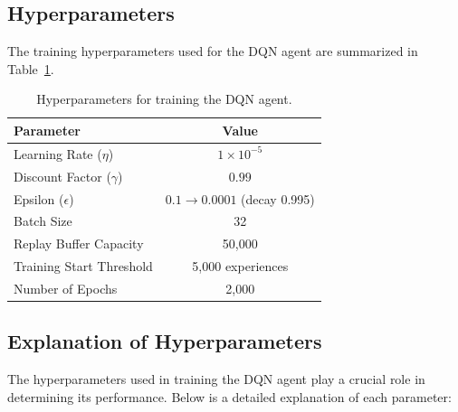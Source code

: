 \documentclass[a4paper,12pt]{article}
\begin{document}
\subsection{Hyperparameters}
The training hyperparameters used for the DQN agent are summarized in Table~\ref{tab:hyperparameters}.
\begin{table}[!ht]
\centering
\begin{tabular}{|l|c|}
\hline
\textbf{Parameter}           & \textbf{Value}          \\ \hline
Learning Rate (\(\eta\))     & \(1 \times 10^{-5}\)     \\ \hline
Discount Factor (\(\gamma\)) & \(0.99\)                \\ \hline
Epsilon (\(\epsilon\))       & \(0.1 \rightarrow 0.0001\) (decay 0.995) \\ \hline
Batch Size                   & 32                      \\ \hline
Replay Buffer Capacity       & 50,000                  \\ \hline
Training Start Threshold     & 5,000 experiences       \\ \hline
Number of Epochs             & 2,000                   \\ \hline
\end{tabular}
\caption{Hyperparameters for training the DQN agent.}
\label{tab:hyperparameters}
\end{table}

\subsection{Explanation of Hyperparameters}
The hyperparameters used in training the DQN agent play a crucial role in determining its performance. Below is a detailed explanation of each parameter:
\end{document}
